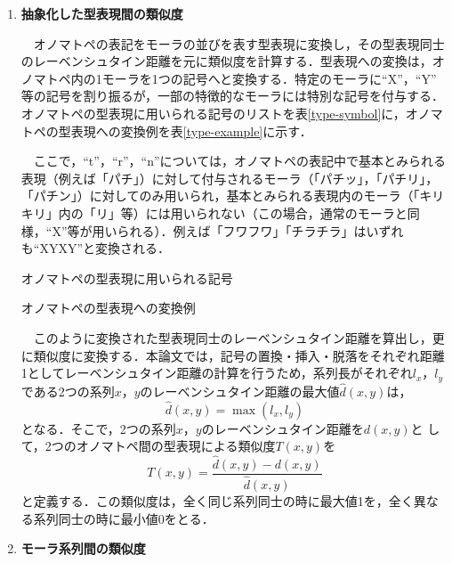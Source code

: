 \documentclass[japanese]{jnlp_1.4}
\begin{document}
\begin{enumerate}
\item \textbf{抽象化した型表現間の類似度}

　オノマトペの表記をモーラの並びを表す型表現\cite{Article_04}に変換し，その型表現同士のレーベンシュタイン距離を元に類似度を計算する．型表現への変換は，オノマトペ内の1モーラを1つの記号へと変換する．特定のモーラに``X''，``Y'' 等の記号を割り振るが，一部の特徴的なモーラには特別な記号を付与する．オノマトペの型表現に用いられる記号のリストを表\ref{type-symbol}に，オノマトペの型表現への変換例を表\ref{type-example}に示す．

　ここで，``t''，``r''，``n''については，オノマトペの表記中で基本とみられる表現（例えば「パチ」）に対して付与されるモーラ（「パチッ」，「パチリ」，「パチン」）に対してのみ用いられ，基本とみられる表現内のモーラ（「キリキリ」内の「リ」等）には用いられない（この場合，通常のモーラと同様，``X''等が用いられる）．例えば「フワフワ」「チラチラ」はいずれも``XYXY''と変換される．

\begin{table}[b]
\hfill
\begin{minipage}{189pt}
\caption{オノマトペの型表現に用いられる記号}
\label{type-symbol}

\end{minipage}
\hfill
\begin{minipage}{162pt}
\caption{オノマトペの型表現への変換例}
\label{type-example}

\end{minipage}
\hfill
\end{table}


　このように変換された型表現同士のレーベンシュタイン距離を算出し，更に類似度に変換する．本論文では，記号の置換・挿入・脱落をそれぞれ距離1としてレーベンシュタイン距離の計算を行うため，系列長がそれぞれ$l_{x}$，$l_{y}$である2つの系列$x$，$y$のレーベンシュタイン距離の最大値$\hat{d}(x, y)$は，
\begin{equation}
\hat{d}(x, y) = \max(l_{x}, l_{y})
\end{equation}
となる．そこで，2つの系列$x$，$y$のレーベンシュタイン距離を$d(x, y)$と
して，2つのオノマトペ間の型表現による類似度$T(x, y)$を
\begin{equation}
T(x, y) = \frac{\hat{d}(x, y) - d(x, y)}{\hat{d}(x, y)}\label{eq:leven}
\end{equation}
と定義する．この類似度は，全く同じ系列同士の時に最大値1を，全く異なる系列同士の時に最小値0をとる．



\item \textbf{モーラ系列間の類似度}


\end{enumerate}
\end{document}
